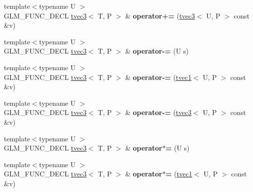 \begin{DoxyCompactItemize}
\item 
\hypertarget{structglm_1_1tvec3_aca33e625fbb5231fe04a31a3f6ac7d9c}{{\footnotesize template$<$typename U $>$ }\\G\-L\-M\-\_\-\-F\-U\-N\-C\-\_\-\-D\-E\-C\-L \hyperlink{structglm_1_1tvec3}{tvec3}$<$ T, P $>$ \& {\bfseries operator+=} (\hyperlink{structglm_1_1tvec3}{tvec3}$<$ U, P $>$ const \&v)}\label{structglm_1_1tvec3_aca33e625fbb5231fe04a31a3f6ac7d9c}

\item 
\hypertarget{structglm_1_1tvec3_aaa69240a37af8d01685e5e04360fb18c}{{\footnotesize template$<$typename U $>$ }\\G\-L\-M\-\_\-\-F\-U\-N\-C\-\_\-\-D\-E\-C\-L \hyperlink{structglm_1_1tvec3}{tvec3}$<$ T, P $>$ \& {\bfseries operator-\/=} (U s)}\label{structglm_1_1tvec3_aaa69240a37af8d01685e5e04360fb18c}

\item 
\hypertarget{structglm_1_1tvec3_a8ebee86f6ea622e744ecedaf7e7db9ff}{{\footnotesize template$<$typename U $>$ }\\G\-L\-M\-\_\-\-F\-U\-N\-C\-\_\-\-D\-E\-C\-L \hyperlink{structglm_1_1tvec3}{tvec3}$<$ T, P $>$ \& {\bfseries operator-\/=} (\hyperlink{structglm_1_1tvec1}{tvec1}$<$ U, P $>$ const \&v)}\label{structglm_1_1tvec3_a8ebee86f6ea622e744ecedaf7e7db9ff}

\item 
\hypertarget{structglm_1_1tvec3_a356d8232f5a66a5e971ab1cb46593722}{{\footnotesize template$<$typename U $>$ }\\G\-L\-M\-\_\-\-F\-U\-N\-C\-\_\-\-D\-E\-C\-L \hyperlink{structglm_1_1tvec3}{tvec3}$<$ T, P $>$ \& {\bfseries operator-\/=} (\hyperlink{structglm_1_1tvec3}{tvec3}$<$ U, P $>$ const \&v)}\label{structglm_1_1tvec3_a356d8232f5a66a5e971ab1cb46593722}

\item 
\hypertarget{structglm_1_1tvec3_a3f6d5e9974493273c6770a92acd0cfc6}{{\footnotesize template$<$typename U $>$ }\\G\-L\-M\-\_\-\-F\-U\-N\-C\-\_\-\-D\-E\-C\-L \hyperlink{structglm_1_1tvec3}{tvec3}$<$ T, P $>$ \& {\bfseries operator$\ast$=} (U s)}\label{structglm_1_1tvec3_a3f6d5e9974493273c6770a92acd0cfc6}

\item 
\hypertarget{structglm_1_1tvec3_a8bf034f6ec15f8a4d316338cbe30d727}{{\footnotesize template$<$typename U $>$ }\\G\-L\-M\-\_\-\-F\-U\-N\-C\-\_\-\-D\-E\-C\-L \hyperlink{structglm_1_1tvec3}{tvec3}$<$ T, P $>$ \& {\bfseries operator$\ast$=} (\hyperlink{structglm_1_1tvec1}{tvec1}$<$ U, P $>$ const \&v)}\label{structglm_1_1tvec3_a8bf034f6ec15f8a4d316338cbe30d727}


\end{DoxyCompactItemize}
